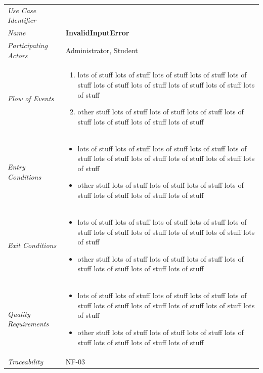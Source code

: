 \documentclass[12pt,letterpaper]{article}
\begin{document}
\begin{center}
	\begin{tabu} to 
		\toprule
		Use Case Identifier & \invalidinputerror{} \\
		Name & {\bf InvalidInputError} \\
		Participating Actors & Administrator, Student \\
		Flow of Events & 
	    \begin{enumerate}[topsep=-1em]
		    \item lots of stuff lots of stuff lots of stuff lots of stuff lots of stuff lots of stuff lots of stuff lots of stuff lots of stuff lots of stuff
		    \item other stuff lots of stuff lots of stuff lots of stuff lots of stuff lots of stuff lots of stuff lots of stuff
		\end{enumerate} \\

		Entry Conditions &
		\begin{itemize}[topsep=-1em]
		    \item lots of stuff lots of stuff lots of stuff lots of stuff lots of stuff lots of stuff lots of stuff lots of stuff lots of stuff lots of stuff
		    \item other stuff lots of stuff lots of stuff lots of stuff lots of stuff lots of stuff lots of stuff lots of stuff
        \end{itemize} \\

		Exit Conditions &
		\begin{itemize}[topsep=-1em]
		    \item lots of stuff lots of stuff lots of stuff lots of stuff lots of stuff lots of stuff lots of stuff lots of stuff lots of stuff lots of stuff
		    \item other stuff lots of stuff lots of stuff lots of stuff lots of stuff lots of stuff lots of stuff lots of stuff
        \end{itemize} \\

		Quality Requirements &
		\begin{itemize}[topsep=-1em]
		    \item lots of stuff lots of stuff lots of stuff lots of stuff lots of stuff lots of stuff lots of stuff lots of stuff lots of stuff lots of stuff
		    \item other stuff lots of stuff lots of stuff lots of stuff lots of stuff lots of stuff lots of stuff lots of stuff
        \end{itemize} \\

		Traceability & NF-03 \\
		\toprule
	\end{tabu}
\end{center}
\end{document}
